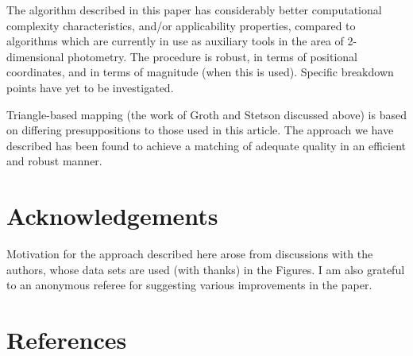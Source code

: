 The algorithm described in this paper has considerably better 
computational complexity 
characteristics, and/or applicability properties,
compared to algorithms which are currently in use as auxiliary tools in the
area of 2-dimensional photometry.   The procedure is robust, in terms of
positional coordinates, and in terms of magnitude (when this is used).  
Specific breakdown points have yet to be investigated.

Triangle-based mapping (the
work of Groth and Stetson discussed above) is based
on differing presuppositions to those used in this article.  The approach
we have described has been found to achieve a matching of adequate quality
in an efficient and robust manner.

\section*{Acknowledgements}

Motivation for the approach described here arose from discussions with the
authors, whose data sets are used (with thanks) in the Figures.  I am also
grateful to an anonymous referee for suggesting 
various improvements in the paper.

\section*{References}

